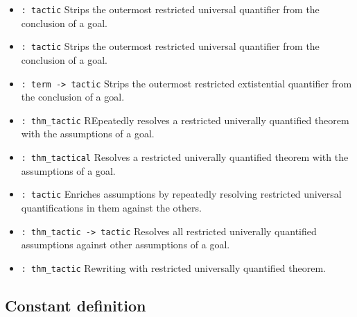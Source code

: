 \documentclass[12pt]{article}
\begin{document}
\begin{itemize}
\item {} \verb|: tactic|\newline
Strips the outermost restricted universal quantifier from
the conclusion of a goal.

\item {} \verb|: tactic|\newline
Strips the outermost restricted universal quantifier from
the conclusion of a goal.

\item {} \verb|: term -> tactic|\newline
Strips the outermost restricted extistential quantifier from
the conclusion of a goal.

\item {} \verb|: thm_tactic|\newline
REpeatedly resolves a restricted univerally quantified theorem with
the assumptions of a goal.

\item {} \verb|: thm_tactical|\newline
Resolves a restricted univerally quantified theorem with
the assumptions of a goal.

\item {} \verb|: tactic|\newline
Enriches assumptions by repeatedly resolving restricted universal
quantifications in them against the others.

\item {} \verb|: thm_tactic -> tactic|\newline
Resolves all restricted univerally quantified assumptions against
other assumptions of a goal.

\item {} \verb|: thm_tactic|\newline
Rewriting with restricted universally quantified theorem.
\end{itemize}

\subsection*{Constant definition}
\end{document}
